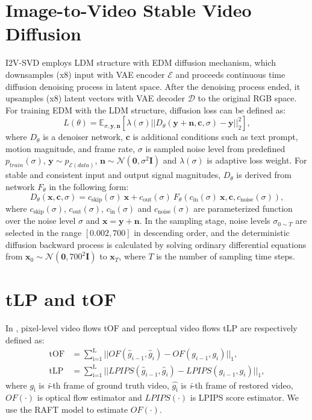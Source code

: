

\section{Image-to-Video Stable Video Diffusion}
I2V-SVD employs LDM \cite{ldm} structure with EDM \cite{edm} diffusion mechanism, which downsamples (x8) input with VAE encoder $\mathcal{E}$ and proceeds continuous time diffusion denoising process in latent space. After the denoising process ended, it upsamples (x8) latent vectors with VAE decoder $\mathcal{D}$ to the original RGB space. For training EDM with the LDM structure, diffusion loss can be defined as:
\begin{equation}
  L(\theta) = \mathbb{E}_{\sigma,\bm{y},\bm{n}} \left[ \lambda(\sigma) || D_{\theta}(\bm{y+n}, \bm{c}, \sigma) - \bm{y} ||^{2}_{2} \right],
  \label{eq:1}
\end{equation}
where $D_{\theta}$ is a denoiser network, $\bm{c}$ is additional conditions such as text prompt, motion magnitude, and frame rate, $\sigma$ is sampled noise level from predefined $p_{train}(\sigma)$, $\bm{y} \sim p_{\mathcal{E}(data)}$, $\bm{n} \sim \mathcal{N}(\bm{0},\sigma^2\bm{I})$ and $\lambda(\sigma)$ is adaptive loss weight. For stable and consistent input and output signal magnitudes, $D_{\theta}$ is derived from network $F_{\theta}$ in the following form:
 \begin{equation}
     D_{\theta}(\bm{x}, \bm{c}, \sigma)=c_{\text{skip}}(\sigma) \ \bm{x}+c_{\text{out}}(\sigma) \ F_{\theta}(c_{\text{in}}(\sigma) \ \bm{x}, \bm{c}, c_{\text{noise}}(\sigma)),
     \label{eq:2}
 \end{equation}
where $c_\text{skip}(\sigma)$, $c_\text{out}(\sigma)$, $c_\text{in}(\sigma)$ and $c_\text{noise}(\sigma)$ are parameterized function over the noise level $\sigma$ and $\bm{x}=\bm{y}+\bm{n}$. In the sampling stage, noise levels $\sigma_{0\sim T}$ are selected in the range $[0.002, 700]$ in descending order, and the deterministic diffusion backward process is calculated by solving ordinary differential equations from $\bm{x}_{0} \sim \mathcal{N}(\bm{0}, 700^2\bm{I})$ to $\bm{x}_{T}$, where $T$ is the number of sampling time steps.

\section{tLP and tOF}
In \cite{tOFtLP}, pixel-level video flows tOF and perceptual video flows tLP are respectively defined as:
\begin{align}
    \text{tOF} &= \sum_{\text{i=1}}^{\text{L}} ||OF(\hat{g}_{{i-1}}, \hat{g}_{{i}})-OF(g_{{i-1}}, g_{{i}})||_1, \\
    \text{tLP} &= \sum_{\text{i=1}}^{\text{L}} ||LPIPS(\hat{g}_{{i-1}}, \hat{g}_{{i}})-LPIPS(g_{{i-1}}, g_{{i}})||_1,
\end{align}
where $g_\text{i}$ is \textit{i}-th frame of ground truth video, $\hat{g_\text{i}}$ is \textit{i}-th frame of restored video, $OF(\cdot)$ is optical flow estimator and $LPIPS(\cdot)$ is LPIPS score estimator. We use the RAFT \cite{raft} model to estimate $OF(\cdot)$. 

